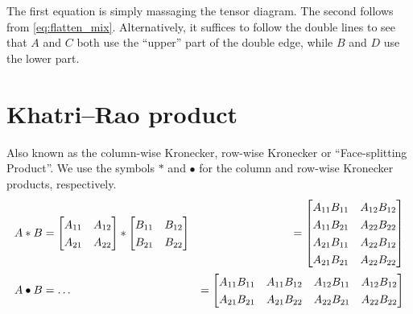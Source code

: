 The first equation is simply massaging the tensor diagram.
The second follows from \eqref{eq:flatten_mix}.
Alternatively, it suffices to follow the double lines to see that $A$ and $C$ both use the ``upper'' part of the double edge, while $B$ and $D$ use the lower part.


\section{Khatri–Rao product}
Also known as the column-wise Kronecker, row-wise Kronecker or ``Face-splitting Product''.
We use the symbols $\ast$ and $\bullet$ for the column and row-wise Kronecker products, respectively.
\begin{align*}
   A \ast B &=
   \renewcommand*{\arraystretch}{1.3}
   \begin{bmatrix}
      A_{11} & A_{12} \\
      A_{21} & A_{22}
   \end{bmatrix}
   \ast
   \renewcommand*{\arraystretch}{1.3}
   \begin{bmatrix}
      B_{11} & B_{12} \\
      B_{21} & B_{22}
   \end{bmatrix}
            &=
   \renewcommand*{\arraystretch}{1.3}
   \begin{bmatrix}
      A_{11} B_{11} & A_{12} B_{12} \\
      A_{11} B_{21} & A_{22} B_{22} \\
      A_{21} B_{11} & A_{22} B_{12} \\
      A_{21} B_{21} & A_{22} B_{22}
   \end{bmatrix}
   \\
   A \bullet B &= \dots
            &=
   \renewcommand*{\arraystretch}{1.3}
   \begin{bmatrix}
      A_{11}  B_{11} & A_{11} B_{12} & A_{12} B_{11} & A_{12} B_{12} \\
      A_{21}  B_{21} & A_{21} B_{22} & A_{22} B_{21} & A_{22} B_{22}
   \end{bmatrix}
\end{align*}

